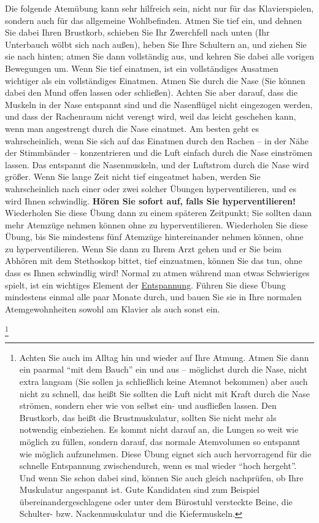 Die folgende Atemübung kann sehr hilfreich sein, nicht nur für das Klavierspielen, sondern auch für das allgemeine Wohlbefinden.
Atmen Sie tief ein, und dehnen Sie dabei Ihren Brustkorb, schieben Sie Ihr Zwerchfell nach unten (Ihr Unterbauch wölbt sich nach außen), heben Sie Ihre Schultern an, und ziehen Sie sie nach hinten; atmen Sie dann vollständig aus, und kehren Sie dabei alle vorigen Bewegungen um.
Wenn Sie tief einatmen, ist ein vollständiges Ausatmen wichtiger als ein vollständiges Einatmen.
Atmen Sie durch die Nase (Sie können dabei den Mund offen lassen oder schließen). Achten Sie aber darauf, dass die Muskeln in der Nase entspannt sind und die Nasenflügel nicht eingezogen werden, und dass der Rachenraum nicht verengt wird, weil das leicht geschehen kann, wenn man angestrengt durch die Nase einatmet. Am besten geht es wahrscheinlich, wenn Sie sich auf das Einatmen durch den Rachen -- in der Nähe der Stimmbänder -- konzentrieren und die Luft einfach durch die Nase einströmen lassen. Das entspannt die Nasenmuskeln, und der Luftstrom durch die Nase wird größer.
Wenn Sie lange Zeit nicht tief eingeatmet haben, werden Sie wahrscheinlich nach einer oder zwei solcher Übungen hyperventilieren, und es wird Ihnen schwindlig. \textbf{Hören Sie sofort auf, falls Sie hyperventilieren!}
Wiederholen Sie diese Übung dann zu einem späteren Zeitpunkt; Sie sollten dann mehr Atemzüge nehmen können ohne zu hyperventilieren.
Wiederholen Sie diese Übung, bis Sie mindestens fünf Atemzüge hintereinander nehmen können, ohne zu hyperventilieren.
Wenn Sie dann zu Ihrem Arzt gehen und er Sie beim Abhören mit dem Stethoskop bittet, tief einzuatmen, können Sie das tun, ohne dass es Ihnen schwindlig wird!
Normal zu atmen während man etwas Schwieriges spielt, ist ein wichtiges Element der \hyperref[c1ii14]{Entspannung}.
Führen Sie diese Übung mindestens einmal alle paar Monate durch, und bauen Sie sie in Ihre normalen Atemgewohnheiten sowohl am Klavier als auch sonst ein.

\label{c1ii21uebung}\footnote{Achten Sie auch im Alltag hin und wieder auf Ihre Atmung. Atmen Sie dann ein paarmal \enquote{mit dem Bauch} ein und aus -- möglichst durch die Nase, nicht extra langsam (Sie sollen ja schließlich keine Atemnot bekommen) aber auch nicht zu schnell, das heißt Sie sollten die Luft nicht mit Kraft durch die Nase strömen, sondern eher wie von selbst ein- und ausfließen lassen. Den Brustkorb, das heißt die Brustmuskulatur, sollten Sie nicht mehr als notwendig einbeziehen. Es kommt nicht darauf an, die Lungen so weit wie möglich zu füllen, sondern darauf, das normale Atemvolumen so entspannt wie möglich aufzunehmen. Diese Übung eignet sich auch hervorragend für die schnelle Entspannung zwischendurch, wenn es mal wieder \enquote{hoch hergeht}. Und wenn Sie schon dabei sind, können Sie auch gleich nachprüfen, ob Ihre Muskulatur angespannt ist. Gute Kandidaten sind zum Beispiel übereinandergeschlagene oder unter dem Bürostuhl versteckte Beine, die Schulter- bzw. Nackenmuskulatur und die 
Kiefermuskeln.}


